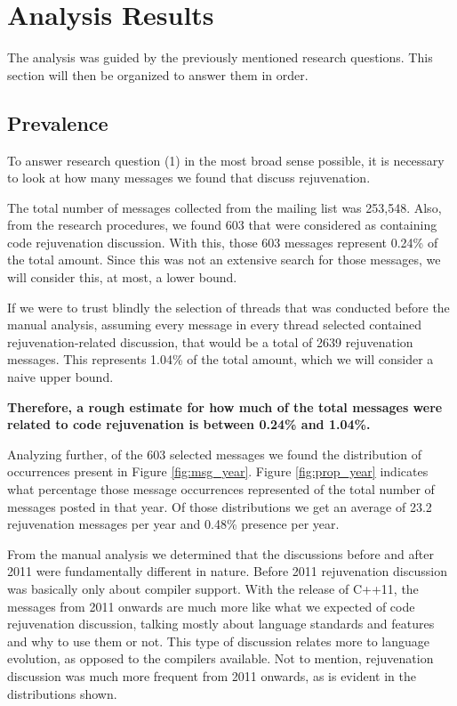 


\section{Analysis Results}
The analysis was guided by the previously mentioned research questions. This section will then be organized to answer them in order.

\subsection{Prevalence}

To answer research question (1) in the most broad sense possible, it is necessary to look at how many messages we found that discuss rejuvenation.

The total number of messages collected from the mailing list was 253,548. Also, from the research procedures, we found 603 that were considered as containing code rejuvenation discussion. With this, those 603 messages represent 0.24\% of the total amount. Since this was not an extensive search for those messages, we will consider this, at most, a lower bound.

{\color{red}If we were to trust blindly the selection of threads that was conducted before the manual analysis, assuming every message in every thread selected contained rejuvenation-related discussion, that would be a total of 2639 rejuvenation messages. This represents 1.04\% of the total amount, which we will consider a naive upper bound.

\textbf{Therefore, a rough estimate for how much of the total messages were related to code rejuvenation is between 0.24\% and 1.04\%.}}

Analyzing further, of the 603 selected messages we found the distribution of occurrences present in Figure \ref{fig:msg_year}. Figure \ref{fig:prop_year} indicates what percentage those message occurrences represented of the total number of messages posted in that year. Of those distributions we get an average of 23.2 rejuvenation messages per year and 0.48\% presence per year.

From the manual analysis we determined that the discussions before and after 2011 were fundamentally different in nature. Before 2011 rejuvenation discussion was basically only about compiler support. With the release of C++11, the messages from 2011 onwards are much more like what we expected of code rejuvenation discussion, talking mostly about language standards and features and why to use them or not. This type of discussion relates more to language evolution, as opposed to the compilers available. Not to mention, rejuvenation discussion was much more frequent from 2011 onwards, as is evident in the distributions shown.

